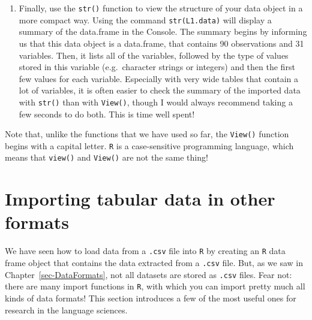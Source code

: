 \documentclass[
  letterpaper,
  DIV=11,
  numbers=noendperiod]{scrreprt}
\begin{document}
\begin{enumerate}
  to edit things, we want to ensure that we keep track of our changes in
  a script!). Browse through the table and check that everything ``looks
  healthy''. This is much like visually inspecting and smelling
  ingredients before using them in a recipe. It's not perfect but if
  something is really off, you should notice it. Check that each cell
  appears to have one and only one value.
\item
  Finally, use the \texttt{str()} function to view the structure of your
  data object in a more compact way. Using the command
  \texttt{str(L1.data)} will display a summary of the data.frame in the
  Console. The summary begins by informing us that this data object is a
  data.frame, that contains 90 observations and 31 variables. Then, it
  lists all of the variables, followed by the type of values stored in
  this variable (e.g.~character strings or integers) and then the first
  few values for each variable. Especially with very wide tables that
  contain a lot of variables, it is often easier to check the summary of
  the imported data with \texttt{str()} than with \texttt{View()},
  though I would always recommend taking a few seconds to do both. This
  is time well spent!
\end{enumerate}

\begin{tcolorbox}[enhanced jigsaw, arc=.35mm, bottomrule=.15mm, bottomtitle=1mm, breakable, colback=white, colbacktitle=quarto-callout-warning-color!10!white, colframe=quarto-callout-warning-color-frame, coltitle=black, left=2mm, leftrule=.75mm, opacityback=0, opacitybacktitle=0.6, rightrule=.15mm, title=\textcolor{quarto-callout-warning-color}{\faExclamationTriangle}\hspace{0.5em}{Case matte\texttt{R}s!}, titlerule=0mm, toprule=.15mm, toptitle=1mm]

Note that, unlike the functions that we have used so far, the
\texttt{View()} function begins with a capital letter. \texttt{R} is a
case-sensitive programming language, which means that \texttt{view()}
and \texttt{View()} are not the same thing!

\end{tcolorbox}

\section{Importing tabular data in other
formats}\label{sec-ImportingTabularData}

We have seen how to load data from a \texttt{.csv} file into \texttt{R}
by creating an \texttt{R} data frame object that contains the data
extracted from a \texttt{.csv} file. But, as we saw in
Chapter~\ref{sec-DataFormats}, not all datasets are stored as
\texttt{.csv} files. Fear not: there are many import functions in
\texttt{R}, with which you can import pretty much all kinds of data
formats! This section introduces a few of the most useful ones for
research in the language sciences.
\end{document}
